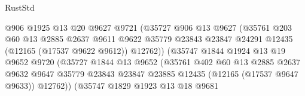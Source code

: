 \begin{lexlean}{RustStd}
\begin{coremodule}
                                    @906
                                    @1925
                                    @13
                                    @20
                                    @9627
                                    @9721
                                    (@35727
                                      @906
                                      @13
                                      @9627
                                      (@35761
                                        @203
                                        @60
                                        @13
                                        @2885
                                        @2637
                                        @9611
                                        @9622
                                        @35779
                                        @23843
                                        @23847
                                        @24291
                                        @12435
                                        (@12165 (@17537 @9622 @9612))
                                        @12762))
                                    (@35747
                                      @1844
                                      @1924
                                      @13
                                      @19
                                      @9652
                                      @9720
                                      (@35727
                                        @1844
                                        @13
                                        @9652
                                        (@35761
                                          @402
                                          @60
                                          @13
                                          @2885
                                          @2637
                                          @9632
                                          @9647
                                          @35779
                                          @23843
                                          @23847
                                          @23885
                                          @12435
                                          (@12165 (@17537 @9647 @9633))
                                          @12762))
                                      (@35747
                                        @1829
                                        @1923
                                        @13
                                        @18
                                        @9681

\end{coremodule}
\end{lexlean}
